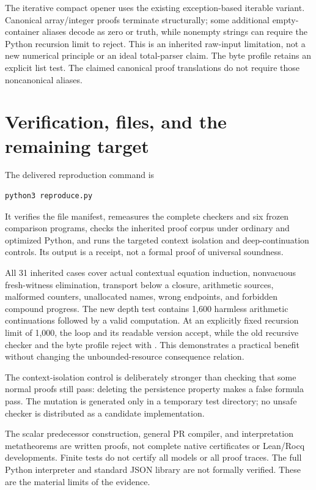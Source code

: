 The iterative compact opener uses the existing exception-based
iterable variant. Canonical array/integer proofs terminate
structurally; some additional empty-container aliases decode as
zero or truth, while nonempty strings can require the Python
recursion limit to reject. This is an inherited raw-input limitation,
not a new numerical principle or an ideal total-parser claim.
The byte profile retains an explicit list test. The claimed
canonical proof translations do not require those noncanonical aliases.

\section{Verification, files, and the remaining target}
\label{sec:verification}

The delivered reproduction command is
\begin{lstlisting}
python3 reproduce.py
\end{lstlisting}
It verifies the file manifest, remeasures the complete checkers and
six frozen comparison programs, checks the inherited proof corpus
under ordinary and optimized Python, and runs the targeted context
isolation and deep-continuation controls. Its output is a receipt,
not a formal proof of universal soundness.

All 31 inherited cases cover actual contextual equation induction,
nonvacuous fresh-witness elimination, transport below a closure,
arithmetic sources, malformed counters, unallocated names, wrong
endpoints, and forbidden compound progress. The new depth test
contains 1,600 harmless arithmetic continuations followed by a
valid computation. At an explicitly fixed recursion limit of 1,000,
the loop and its readable version accept, while the old recursive
checker and the byte profile reject with .
This demonstrates a practical benefit without changing the
unbounded-resource consequence relation.

The context-isolation control is deliberately stronger than checking
that some normal proofs still pass: deleting the persistence
property makes a false formula pass. The mutation is generated only
in a temporary test directory; no unsafe checker is distributed as
a candidate implementation.

The scalar predecessor construction, general PR compiler, and
interpretation metatheorems are written proofs, not complete native
certificates or Lean/Rocq developments. Finite tests do not certify
all models or all proof traces. The full Python interpreter and
standard JSON library are not formally verified. These are the
material limits of the evidence.

